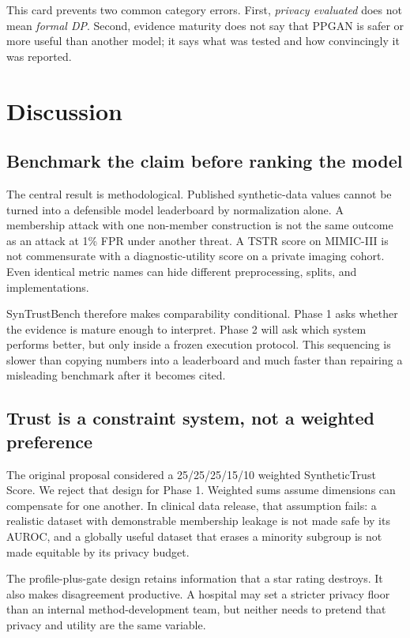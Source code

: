 \documentclass[11pt,letterpaper]{article}
\begin{document}
This card prevents two common category errors. First, \emph{privacy evaluated} does not mean \emph{formal DP}. Second, evidence maturity does not say that PPGAN is safer or more useful than another model; it says what was tested and how convincingly it was reported.

\section{Discussion}

\subsection{Benchmark the claim before ranking the model}

The central result is methodological. Published synthetic-data values cannot be turned into a defensible model leaderboard by normalization alone. A membership attack with one non-member construction is not the same outcome as an attack at 1\% FPR under another threat. A TSTR score on MIMIC-III is not commensurate with a diagnostic-utility score on a private imaging cohort. Even identical metric names can hide different preprocessing, splits, and implementations.

SynTrustBench therefore makes comparability conditional. Phase 1 asks whether the evidence is mature enough to interpret. Phase 2 will ask which system performs better, but only inside a frozen execution protocol. This sequencing is slower than copying numbers into a leaderboard and much faster than repairing a misleading benchmark after it becomes cited.

\subsection{Trust is a constraint system, not a weighted preference}

The original proposal considered a 25/25/25/15/10 weighted SyntheticTrust Score. We reject that design for Phase 1. Weighted sums assume dimensions can compensate for one another. In clinical data release, that assumption fails: a realistic dataset with demonstrable membership leakage is not made safe by its AUROC, and a globally useful dataset that erases a minority subgroup is not made equitable by its privacy budget.

The profile-plus-gate design retains information that a star rating destroys. It also makes disagreement productive. A hospital may set a stricter privacy floor than an internal method-development team, but neither needs to pretend that privacy and utility are the same variable.
\end{document}
